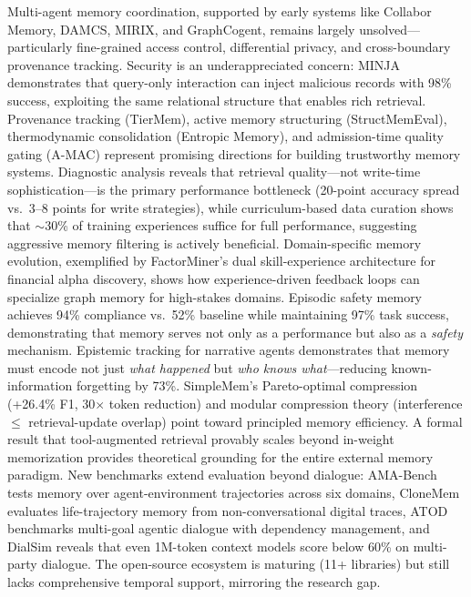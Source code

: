 \documentclass[hf]{ceurart}
\begin{document}
Multi-agent memory coordination, supported by early systems like
Collabor Memory, DAMCS, MIRIX, and GraphCogent, remains largely
unsolved---particularly fine-grained access control, differential
privacy, and cross-boundary provenance tracking.
Security is an underappreciated concern: MINJA demonstrates that
query-only interaction can inject malicious records with 98\% success,
exploiting the same relational structure that enables rich retrieval.
Provenance tracking (TierMem), active memory structuring
(StructMemEval), thermodynamic consolidation (Entropic Memory),
and admission-time quality gating (A-MAC) represent promising
directions for building trustworthy memory systems. Diagnostic
analysis reveals that retrieval quality---not write-time
sophistication---is the primary performance bottleneck (20-point
accuracy spread vs.\ 3--8 points for write strategies), while
curriculum-based data curation shows that ${\sim}30$\% of training
experiences suffice for full performance, suggesting aggressive
memory filtering is actively beneficial.
Domain-specific memory evolution, exemplified by
FactorMiner's dual skill-experience architecture for financial alpha
discovery, shows how experience-driven feedback loops can specialize
graph memory for high-stakes domains.
Episodic safety memory achieves 94\% compliance vs.\ 52\% baseline
while maintaining 97\% task success, demonstrating that memory serves
not only as a performance but also as a \emph{safety} mechanism.
Epistemic tracking for narrative agents demonstrates that memory must
encode not just \emph{what happened} but \emph{who knows what}---reducing
known-information forgetting by 73\%. SimpleMem's Pareto-optimal
compression (+26.4\% F1, 30$\times$ token reduction) and modular
compression theory (interference $\leq$ retrieval-update overlap)
point toward principled memory efficiency. A formal result that
tool-augmented retrieval provably scales beyond in-weight memorization
provides theoretical grounding for the entire external memory paradigm.
New benchmarks extend evaluation beyond dialogue: AMA-Bench tests
memory over agent-environment trajectories across six domains,
CloneMem evaluates life-trajectory memory from non-conversational
digital traces, ATOD benchmarks multi-goal agentic dialogue with
dependency management, and DialSim reveals that even 1M-token
context models score below 60\% on multi-party dialogue.
The open-source ecosystem is maturing (11+ libraries)
but still lacks comprehensive temporal support, mirroring the
research gap.
\end{document}
